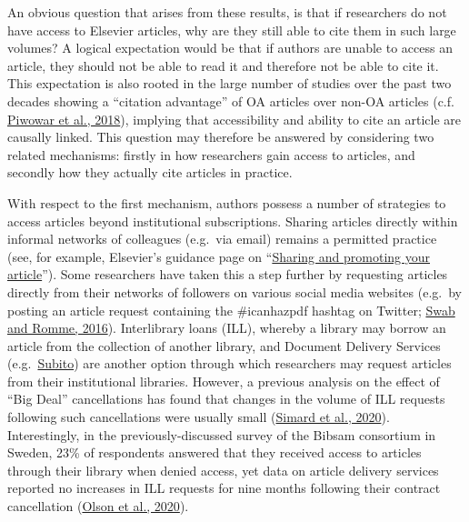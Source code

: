 \documentclass[
]{article}
\begin{document}
An obvious question that arises from these results, is that if researchers do not have access to Elsevier articles, why are they still able to cite them in such large volumes? A logical expectation would be that if authors are unable to access an article, they should not be able to read it and therefore not be able to cite it. This expectation is also rooted in the large number of studies over the past two decades showing a ``citation advantage'' of OA articles over non-OA articles (c.f. \href{https://doi.org/10.7717/peerj.4375}{Piwowar et al., 2018}), implying that accessibility and ability to cite an article are causally linked. This question may therefore be answered by considering two related mechanisms: firstly in how researchers gain access to articles, and secondly how they actually cite articles in practice.

With respect to the first mechanism, authors possess a number of strategies to access articles beyond institutional subscriptions. Sharing articles directly within informal networks of colleagues (e.g.~via email) remains a permitted practice (see, for example, Elsevier's guidance page on ``\href{https://www.elsevier.com/authors/submit-your-paper/sharing-and-promoting-your-article}{Sharing and promoting your article}''). Some researchers have taken this a step further by requesting articles directly from their networks of followers on various social media websites (e.g.~by posting an article request containing the \#icanhazpdf hashtag on Twitter; \href{https://doi.org/10.5596/c16-009}{Swab and Romme, 2016}). Interlibrary loans (ILL), whereby a library may borrow an article from the collection of another library, and Document Delivery Services (e.g.~\href{https://www.subito-doc.de/?lang=en}{Subito}) are another option through which researchers may request articles from their institutional libraries. However, a previous analysis on the effect of ``Big Deal'' cancellations has found that changes in the volume of ILL requests following such cancellations were usually small (\href{https://arxiv.org/abs/2009.04287}{Simard et al., 2020}). Interestingly, in the previously-discussed survey of the Bibsam consortium in Sweden, 23\% of respondents answered that they received access to articles through their library when denied access, yet data on article delivery services reported no increases in ILL requests for nine months following their contract cancellation (\href{http://doi.org/10.1629/uksg.507}{Olson et al., 2020}).
\end{document}
